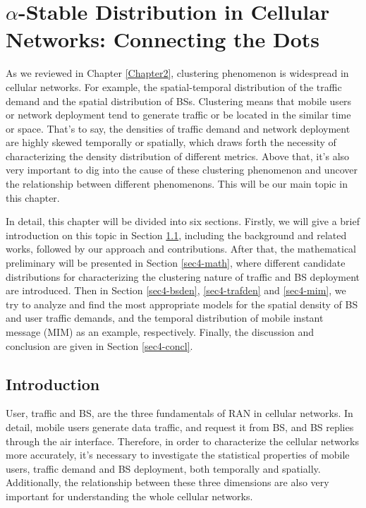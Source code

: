 
\chapter{$\alpha$-Stable Distribution in Cellular Networks: Connecting the Dots} %
\minitoc
\label{Chapter4} %

As we reviewed in Chapter \ref{Chapter2}, clustering phenomenon is widespread in cellular networks. For example, the spatial-temporal distribution of the traffic demand and the spatial distribution of BSs. Clustering means that mobile users or network deployment tend to generate traffic or be located in the similar time or space. That's to say, the densities of traffic demand and network deployment are highly skewed temporally or spatially, which draws forth the necessity of characterizing the density distribution of different metrics. Above that, it's also very important to dig into the cause of these clustering phenomenon and uncover the relationship between different phenomenons. This  will be our main topic in this chapter.

In detail, this chapter will be divided into six sections. Firstly, we will give a brief introduction on this topic in Section \ref{sec4-intro}, including the background and related works, followed by our approach and contributions. After that, the mathematical preliminary will be presented in Section \ref{sec4-math}, where different candidate distributions for characterizing the clustering nature of traffic and BS deployment are introduced. Then in Section \ref{sec4-bsden}, \ref{sec4-trafden} and \ref{sec4-mim}, we try to analyze and find the most appropriate models for the spatial density of BS and user traffic demands, and the temporal distribution of mobile instant message (MIM) as an example, respectively. Finally, the discussion and conclusion are given in Section \ref{sec4-concl}.

\section{Introduction} \label{sec4-intro}
User, traffic and BS, are the three fundamentals of RAN in cellular networks. In detail, mobile users generate data traffic, and request it from BS, and BS replies through the air interface. Therefore, in order to characterize the cellular networks more accurately, it's necessary to investigate the statistical properties of mobile users, traffic demand and BS deployment, both temporally and spatially. Additionally, the relationship between these three dimensions are also very important for understanding the whole cellular networks.

